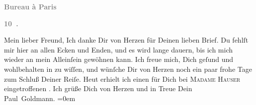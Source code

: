 \begin{ledgroupsized}[t]{13cm}
           \pstart
           \begin{otherlanguage}{french}\textcolor{gray}{\textbf{\textbf{Bureau à Paris}}}\end{otherlanguage}\pend
           \pstart
           \begin{otherlanguage}{french}\textcolor{gray}{\textbf{\textbf{10 .}}}\end{otherlanguage}\pend
           \pstart\center{}Mein lieber Freund,\pend\pstart
           Ich danke Dir von Herzen für Deinen lieben Brief. Du fehlſt mir hier an allen Ecken
               und Enden, und es wird lange dauern, bis ich mich wieder an mein Alleinſein gewöhnen
               kann. Ich freue mich, Dich geſund und wohlbehalten in \label{K_L02813-1v}\label{K_L02813-1h} zu wiſſen, und wünſche Dir von Herzen
               noch ein paar frohe Tage zum Schluß Deiner Reiſe. Heut
               erhielt ich einen für Dich bei \textsc{Madame Hauser} eingetroffenen \label{K_L02813-2v}\label{K_L02813-2h}. Ich grüße Dich von Herzen und in
               Treue\pend
           \pstart
           Dein {\\[\baselineskip]}\spacefill\mbox{Paul Goldmann.}\pend
           \leftskip=0em{}
         
         \endnumbering{}\end{ledgroupsized}  \newcommand{\dateiname}{L02813}\newcommand{\titel}{Paul Goldmann an Arthur Schnitzler, 26. 5. [1897]}\newcommand{\editorInnen}{Martin Anton Müller und Laura Untner}
      